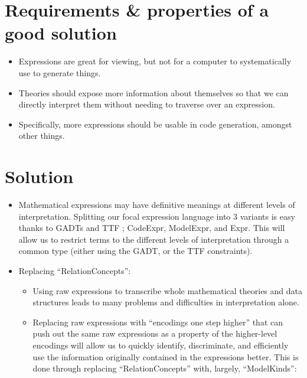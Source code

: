 \section{Requirements \& properties of a good solution}

\begin{itemize}

	\item Expressions are great for viewing, but not for a computer to
	      systematically use to generate things.

	\item Theories should expose more information about themselves so that
	      we can directly interpret them without needing to traverse over
	      an expression.

	\item Specifically, more expressions should be usable in code generation,
	      amongst other things.

\end{itemize}

\section{Solution}

\begin{itemize}

	\item Mathematical expressions may have definitive meanings at different
	      levels of interpretation. Splitting our focal expression language into
	      3 variants is easy thanks to GADTs and TTF \cite{carette2009finally};
	      CodeExpr, ModelExpr, and Expr. This will allow us to restrict terms to
	      the different levels of interpretation through a common type (either
	      using the GADT, or the TTF constraints).

	\item Replacing ``RelationConcepts'':

	      \begin{itemize}

		      \item Using raw expressions to transcribe whole mathematical
		            theories and data structures leads to many problems
		            and difficulties in interpretation alone.

		      \item Replacing raw expressions with ``encodings one step
		            higher'' that can push out the same raw expressions
		            as a property of the higher-level encodings will
		            allow us to quickly identify, discriminate, and efficiently
		            use the information originally contained in the expressions
		            better. This is done through replacing ``RelationConcepts''
		            with, largely, ``ModelKinds'':

	      \end{itemize}

\end{itemize}

